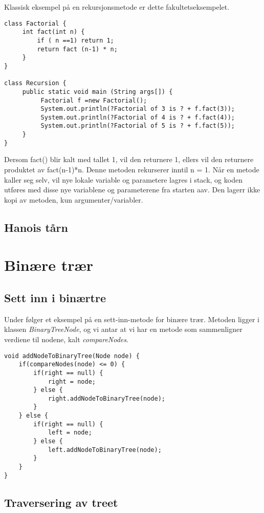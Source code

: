 \documentclass[a4paper,norsk,10pt]{article}
\begin{document}
Klassisk eksempel på en rekursjonsmetode er dette fakultetseksempelet.

\begin{verbatim}
class Factorial {
     int fact(int n) {
         if ( n ==1) return 1;
         return fact (n-1) * n;
     }
}

class Recursion {
     public static void main (String args[]) {
          Factorial f =new Factorial();
          System.out.println(?Factorial of 3 is ? + f.fact(3));
          System.out.println(?Factorial of 4 is ? + f.fact(4));
          System.out.println(?Factorial of 5 is ? + f.fact(5));
     }
}
\end{verbatim}

Dersom fact() blir kalt med tallet 1, vil den returnere 1, ellers vil den returnere produktet av fact(n-1)*n. Denne metoden rekurserer inntil n = 1.
Når en metode kaller seg selv, vil nye lokale variable og parametere lagres i stack, og koden utføres med disse nye variablene og parameterene fra starten aav. Den lagerr ikke kopi av metoden, kun argumenter/variabler.
\subsection{Hanois tårn}
\label{sec-12.1}
\section{Binære trær}
\label{sec-13}
\subsection{Sett inn i binærtre}
\label{sec-13.1}

Under følger et eksempel på en sett-inn-metode for binære
trær. Metoden ligger i klassen \emph{BinaryTreeNode}, og vi antar at vi har
en metode som sammenligner verdiene til nodene, kalt \emph{compareNodes}.

\begin{verbatim}
void addNodeToBinaryTree(Node node) {
    if(compareNodes(node) <= 0) {
        if(right == null) {
            right = node;
        } else {
            right.addNodeToBinaryTree(node);
        }
    } else {
        if(right == null) {
            left = node;
        } else {
            left.addNodeToBinaryTree(node);
        } 
    }
}
\end{verbatim}
\subsection{Traversering av treet}
\label{sec-13.2}
\end{document}
